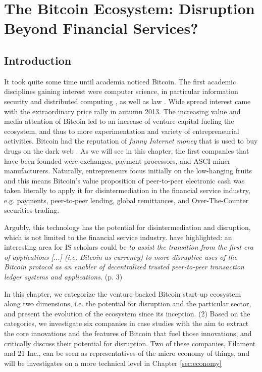 \chapter{The Bitcoin Ecosystem: Disruption Beyond Financial Services?}

\section{Introduction}

It took quite some time until academia noticed Bitcoin. The first academic disciplines gaining interest were computer science, in particular information security \parencite{Karame:2012:DFP:2382196.2382292,Barber2012} and distributed computing \parencite{Babaioff:2012:BRB:2229012.2229022}, as well as law \parencite{Grinberg2011,Ewing2012}. Wide spread interest came with the extraordinary price rally in autumn 2013. The increasing value and media attention of Bitcoin led to an increase of venture capital fueling the ecosystem, and thus to more experimentation and variety of entrepreneurial activities. Bitcoin had the reputation of \emph{funny Internet money} that is used to buy drugs on the dark web \parencite{Christin:2013:TSR:2488388.2488408}. As we will see in this chapter, the first companies that have been founded were exchanges, payment processors, and ASCI miner manufacturers.
Naturally, entrepreneurs focus initially on the low-hanging fruits and this means Bitcoin's value proposition of peer-to-peer electronic cash was taken literally to apply it for disintermediation in the financial service industry, e.g. payments, peer-to-peer lending, global remittances, and Over-The-Counter securities trading. 

Argubly, this technology has the potential for disintermediation and disruption, which is not limited to the financial service industry. \cite{Giaglis2014} have highlighted: an interesting area 
for IS scholars could be \emph{to assist the transition from the first era of applications 
[...] (i.e. Bitcoin as currency) to more disruptive uses of the Bitcoin protocol 
as an enabler of decentralized trusted peer-to-peer transaction ledger systems 
and applications.} (p. 3)

In this chapter, we categorize the venture-backed Bitcoin start-up 
ecosystem along two dimensions, i.e. the potential for disruption and the particular 
sector, and present the evolution of the ecosystem since its inception. (2) Based 
on the categories, we investigate six companies in case studies with the aim to 
extract the core innovations and the features of Bitcoin that fuel those innovations, 
and critically discuss their potential for disruption. Two of these companies, Filament and 21 Inc., can be seen as representatives of the micro economy of things, and will be investigates on a more technical level in Chapter \ref{sec:economy}

